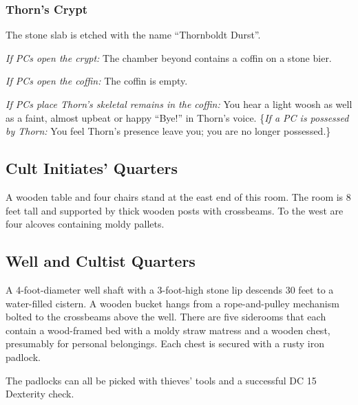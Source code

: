 \subsubsection{Thorn's Crypt}
\begin{readout}
  The stone slab is etched with the name ``Thornboldt Durst''.
  
  \textit{If PCs open the crypt:} The chamber beyond contains a coffin on a stone bier.
  
  \textit{If PCs open the coffin:} The coffin is empty.
  
  \textit{If PCs place Thorn's skeletal remains in the coffin:} You hear a light woosh as well as a faint,
  almost upbeat or happy ``Bye!'' in Thorn's voice. \{\textit{If a PC is possessed by Thorn:} You feel Thorn's
  presence leave you; you are no longer possessed.\}
\end{readout}

\begin{arealinks}
\end{arealinks}


\pagebreak
\subsection{Cult Initiates' Quarters}
\label{sec:CultInitiatesQuarters}
\begin{readout}
  A wooden table and four chairs stand at the east end of this room. The room is 8 feet tall and supported by
  thick wooden posts with crossbeams. To the west are four alcoves containing moldy pallets.
\end{readout}

\begin{arealinks}
\end{arealinks}


\pagebreak
\subsection{Well and Cultist Quarters}
\label{sec:WellAndCultistQuarters}
\begin{readout}
  A 4-foot-diameter well shaft with a 3-foot-high stone lip descends 30 feet to a water-filled cistern.
  A wooden bucket hangs from a rope-and-pulley mechanism bolted to the crossbeams above the well. There are
  five siderooms that each contain a wood-framed bed with a moldy straw matress and a wooden chest, presumably
  for personal belongings. Each chest is secured with a rusty iron padlock.
\end{readout}
The padlocks can all be picked with thieves' tools and a successful DC 15 Dexterity check.

